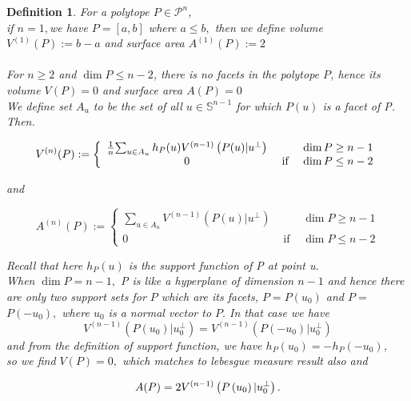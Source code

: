\documentclass[oneside]{book}
\newtheorem{mydef}{Definition}
\begin{document}
  \begin{mydef}


For a polytope $P \in \mathcal{P}^{n}$,\\

if  $n=1,$we have  $P=[a, b]$ where $a \leq b,$ then we define volume $V^{(1)}(P):=b-a$ and  surface area $A^{(1)}(P):=2$ 
\\\\
  For  $ n \geq 2  $ and $\operatorname{dim} P \leq n-2$, there is no facets in the polytope $P$, hence its volume $V(P)=0$ and surface area $A(P)=0$ \\
  
 We define set $A_{{u}}$ to be the set of all $u \in \mathbb{S}^{n-1}$ for which $P(u)$ is a facet of P. Then. 

\begin{equation}
V^{(n)}(P):=\left\{\begin{array}{ccc}
\frac{1}{n} $$ \sum_{u \in A_{u}} h_{P}(u) V^{(n-1)}\left(P(u) | u^{\perp}\right) & & \operatorname{dim} P \geq n-1 \\
0 & \text { if } & \operatorname{dim} P \leq n-2
\end{array}\right.
\end{equation}



and

\begin{equation}
A^{(n)}(P):=\left\{\begin{array}{ccc}
\sum_{u \in A_{u}} V^{(n-1)}\left(P(u) | u^{\perp}\right) & & \operatorname{dim} P \geq n-1 \\
0 & \text { if } & \operatorname{dim} P \leq n-2
\end{array}\right.
\end{equation}


Recall that here $h_{P}(u)$ is the support function of P at point u. \\

 When $\operatorname{dim} P=n-1, $ P is like a hyperplane of dimension $n - 1$  and hence there are only two support sets for $P$ which are its facets, $P=P\left(u_{0}\right)$ and $P=$ $P\left(-u_{0}\right),$ where $u_{0}$ is a normal vector to $P .$ In that case we have $$V^{(n-1)}\left(P\left(u_{0}\right) | u_{0}^{\perp}\right)=V^{(n-1)}\left(P\left(-u_{0}\right) | u_{0}^{\perp}\right)$$
 \newpage
and from the  definition of support function, we have $h_{P}\left(u_{0}\right)=-h_{P}\left(-u_{0}\right)$,\\ so we find $V(P)=0,$ which matches to lebesgue measure result also  and 
 
 \begin{equation}
 A(P)=2 V^{(n-1)}\left(P\left(u_{0}\right) | u_{0}^{\perp}\right).\\\\
\end{equation}
\end{mydef} 
\end{document}
